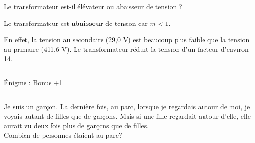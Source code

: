 \documentclass[11pt,a4paper]{article}
\begin{document}
 Le transformateur est-il élévateur ou abaisseur de tension ? 

\begin{tcolorbox}[colback=red!5!white,colframe=red!75!black]
Le transformateur est \textbf{abaisseur} de tension car $m < 1$.

\vspace{2mm}

En effet, la tension au secondaire (29,0 V) est beaucoup plus faible que la tension au primaire (411,6 V). Le transformateur réduit la tension d'un facteur d'environ 14.
\end{tcolorbox}

\vfill 

\hrule 
\begin{center}
   \Large{Énigme : Bonus +1} \\[5mm]
\end{center}



\hrule

  Je suis un garçon. La dernière fois, au parc, lorsque je regardais autour de moi, je voyais autant de filles que de garçons. Mais si une fille regardait autour d'elle, elle aurait vu deux fois plus de garçons que de filles. \\[3mm]
  Combien de personnes étaient au parc?
\end{document}
